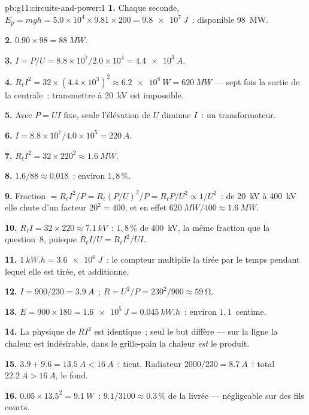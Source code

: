 \begin{solution}{pb:g11:circuits-and-power:1}
\textbf{1.} Chaque seconde, $E_p = mgh = 5.0\times10^{4} \times 9.81
\times 200 = \qty{9.8e7}{J}$~: 
disponible \qty{98}{MW}.

\textbf{2.} $0.90 \times 98 = \qty{88}{MW}$.

\textbf{3.} $I = P/U = 8.8\times10^{7}/2.0\times10^{4} = \qty{4.4e3}{A}$.

\textbf{4.} $R_\ell I^2 = 32 \times (4.4\times10^{3})^2 \approx
\qty{6.2e8}{W} = \qty{620}{MW}$ --- sept fois la sortie de la centrale~:
transmettre à \qty{20}{kV} est impossible.

\textbf{5.} Avec $P = UI$ fixe, seule l'élévation de $U$ diminue $I$~:
un transformateur.

\textbf{6.} $I = 8.8\times10^{7}/4.0\times10^{5} = \qty{220}{A}$.

\textbf{7.} $R_\ell I^2 = 32 \times 220^2 \approx \qty{1.6}{MW}$.

\textbf{8.} $1.6/88 \approx 0.018$~: environ $1{,}8\,\%$.

\textbf{9.} Fraction $= R_\ell I^2/P = R_\ell (P/U)^2/P = R_\ell P/U^2
\propto 1/U^2$~: de \qty{20}{kV} à \qty{400}{kV} elle chute d'un
facteur $20^2 = 400$, et en effet $\qty{620}{MW}/400 \approx
\qty{1.6}{MW}$.

\textbf{10.} $R_\ell I = 32 \times 220 \approx \qty{7.1}{kV}$~: $1{,}8\,\%$
de \qty{400}{kV}, la même fraction que la question~8, puisque
$R_\ell I/U = R_\ell I^2/UI$.

\textbf{11.} $\qty{1}{kW.h} = \qty{3.6e6}{J}$~: le compteur multiplie la
 tirée par le temps pendant lequel
elle est tirée, et additionne.

\textbf{12.} $I = 900/230 = \qty{3.9}{A}$~;
$R = U^2/P = 230^2/900 \approx \qty{59}{\ohm}$.

\textbf{13.} $E = 900 \times 180 = \qty{1.6e5}{J} = \qty{0.045}{kW.h}$~:
environ $1{,}1$~centime.

\textbf{14.} La physique de $RI^2$ est identique~; seul le but
diffère --- sur la ligne la chaleur est indésirable, dans le
grille-pain la chaleur \emph{est} le produit.

\textbf{15.} $3.9 + 9.6 = \qty{13.5}{A} < \qty{16}{A}$~: tient.
Radiateur $2000/230 = \qty{8.7}{A}$~: total $\qty{22.2}{A} >
\qty{16}{A}$, le  fond.

\textbf{16.} $0.05 \times 13.5^2 = \qty{9.1}{W}$~: $9.1/3100 \approx
0.3\,\%$ de la  livrée --- négligeable
sur des fils courts.


\end{solution}
